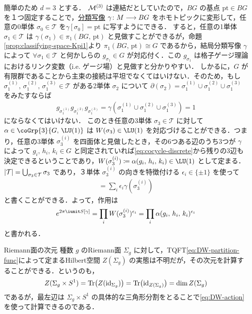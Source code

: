 \documentclass[TQFT_main]{subfiles}
\begin{document}
簡単のため $d=3$ とする．
$\mathcal{M}^{(3)}$ は連結だとしていたので，$BG$ の基点 $\mathrm{pt} \in BG$ を１つ固定することで，\hyperref[prop:universal-basic]{分類写像} $\gamma \colon M \longrightarrow BG$ をホモトピックに変形して，任意の0単体 $\sigma_0 \in \mathcal{T}$ を$\gamma[\sigma_0] = \mathrm{pt}$ に写すようにできる．
すると，任意の1単体 $\sigma_1 \in \mathcal{T}$ は $\gamma(\sigma_1) \in \pi_1(BG,\, \mathrm{pt})$ と見做すことができるが，命題\ref{prop:classifying-space-Kpi1}より $\pi_1(BG,\, \mathrm{pt}) \cong G$ であるから，結局分類写像 $\gamma$ によって $\forall \sigma_1 \in \mathcal{T}$ と何かしらの $g_{\sigma_1} \in G$ が対応付く．この $g_{\sigma_1}$ は格子ゲージ理論におけるリンク変数（i.e. ゲージ場）と見做すと分かりやすい．
しかるに，$G$ が有限群であることから主束の接続は平坦でなくてはいけない．そのため，もし $\sigma^{(1)}_1,\, \sigma^{(2)}_1,\, \sigma^{(3)}_1 \in \mathcal{T}$ がある2単体 $\sigma_2$ について $\partial(\sigma_2) = \sigma^{(1)}_1 \cup \sigma^{(2)}_1 \cup \sigma^{(3)}_1$ をみたすならば
\begin{align}
    \label{eq:cocycle-discrete}
    g_{\sigma_1^{(1)}} g_{\sigma_1^{(2)}} g_{\sigma_1^{(3)}} = \gamma(\sigma^{(1)}_1 \cup \sigma^{(2)}_1 \cup \sigma^{(3)}_1) = 1
\end{align}
にならなくてはいけない．
このとき任意の3単体 $\sigma_3 \in \mathcal{T}$ に対して $\alpha \in \coGrp{3}{G,\, \LU(1)}$ は $W(\sigma_3) \in \LU(1)$ を対応づけることができる．つまり，任意の3単体 $\sigma^{(i)}_3$ を四面体と見做したとき，その6つある辺のうち3つが $\gamma$ によって $g_i,\, h_i,\, k_i \in G$ と同定されていれば\eqref{eq:cocycle-discrete}から残りの3辺も決定できるということであり，$W(\sigma_3^{(i)}) \coloneqq \alpha (g_i,\, h_i,\, k_i) \in \LU(1)$ として定まる．
$\abs{\mathcal{T}} = \bigcup_{\sigma_3 \in \mathcal{T}} \sigma_3$ であり，３単体 $\sigma_3^{(i)}$ の向きを特徴付ける $\epsilon_i \in \{\pm 1\}$ を使って
\begin{align}
    [M] = \sum_i \epsilon_i \gamma(\sigma_3^{(i)})
\end{align}
と書くことができる．よって，作用は
\begin{align}
    \label{eq:DW-action}
    e^{2\pi \iunit S[\gamma]} = \prod_i W(\sigma_3^{(i)})^{\epsilon_i} = \prod_{i} \alpha (g_{i},\, h_i,\, k_i)^{\epsilon_i}
\end{align}
と書かれる．

\begin{myexample}[label=ex:DW-Riemannian]{Riemann面の次元}
    種数 $g$ のRiemann面 $\Sigma_g$ に対して，TQFT\eqref{eq:DW-partition-func}によって定まるHilbert空間 $Z(\Sigma_g)$ の実態は不明だが，その次元を計算することができる．というのも，
    \begin{align}
        Z(\Sigma_g \times S^1) = \Tr \bigl(Z(\mathrm{id}_{\Sigma_g})\bigr) = \Tr \bigl( \mathrm{id}_{Z(\Sigma_g)} \bigr) = \dim Z(\Sigma_g)
    \end{align}
    であるが，最左辺は $\Sigma_g \times S^1$ の具体的な三角形分割をとることで\eqref{eq:DW-action}を使って計算できるのである．
\end{myexample}
\end{document}
